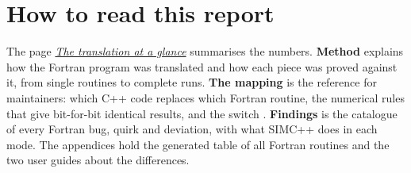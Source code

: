 \section*{How to read this report}
The page \hyperref[dashboard]{\emph{The translation at a glance}} summarises the numbers. \textbf{Method} explains
how the Fortran program was translated and how each piece was proved against it, from single routines to complete
runs. \textbf{The mapping} is the reference for maintainers: which C++ code replaces which Fortran routine, the
numerical rules that give bit-for-bit identical results, and the switch . \textbf{Findings}
is the catalogue of every Fortran bug, quirk and deviation, with what SIMC++ does in each mode. The appendices hold the
generated table of all Fortran routines and the two user guides about the differences.
